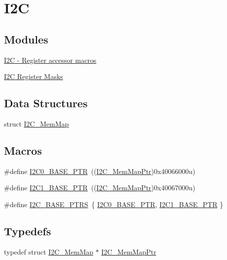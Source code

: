 \hypertarget{group___i2_c___peripheral}{}\section{I2C}
\label{group___i2_c___peripheral}
\subsection*{Modules}
\begin{DoxyCompactItemize}
\item 
\hyperlink{group___i2_c___register___accessor___macros}{I2\+C -\/ Register accessor macros}
\item 
\hyperlink{group___i2_c___register___masks}{I2\+C Register Masks}
\end{DoxyCompactItemize}
\subsection*{Data Structures}
\begin{DoxyCompactItemize}
\item 
struct \hyperlink{struct_i2_c___mem_map}{I2\+C\+\_\+\+Mem\+Map}
\end{DoxyCompactItemize}
\subsection*{Macros}
\begin{DoxyCompactItemize}
\item 
\#define \hyperlink{group___i2_c___peripheral_ga6db92fda81fa3b6a1c8c6a85e66d51a0}{I2\+C0\+\_\+\+B\+A\+S\+E\+\_\+\+P\+TR}~((\hyperlink{group___i2_c___peripheral_ga9902bc02a12982d0c37ec011b4dd89f0}{I2\+C\+\_\+\+Mem\+Map\+Ptr})0x40066000u)
\item 
\#define \hyperlink{group___i2_c___peripheral_gae13da5d584f2a4e2379db927a3f18772}{I2\+C1\+\_\+\+B\+A\+S\+E\+\_\+\+P\+TR}~((\hyperlink{group___i2_c___peripheral_ga9902bc02a12982d0c37ec011b4dd89f0}{I2\+C\+\_\+\+Mem\+Map\+Ptr})0x40067000u)
\item 
\#define \hyperlink{group___i2_c___peripheral_gaee17f364d6d1712b62774e6c33dea554}{I2\+C\+\_\+\+B\+A\+S\+E\+\_\+\+P\+T\+RS}~\{ \hyperlink{group___i2_c___peripheral_ga6db92fda81fa3b6a1c8c6a85e66d51a0}{I2\+C0\+\_\+\+B\+A\+S\+E\+\_\+\+P\+TR}, \hyperlink{group___i2_c___peripheral_gae13da5d584f2a4e2379db927a3f18772}{I2\+C1\+\_\+\+B\+A\+S\+E\+\_\+\+P\+TR} \}
\end{DoxyCompactItemize}
\subsection*{Typedefs}
\begin{DoxyCompactItemize}
\item 
typedef struct \hyperlink{struct_i2_c___mem_map}{I2\+C\+\_\+\+Mem\+Map} $\ast$ \hyperlink{group___i2_c___peripheral_ga9902bc02a12982d0c37ec011b4dd89f0}{I2\+C\+\_\+\+Mem\+Map\+Ptr}
\end{DoxyCompactItemize}


